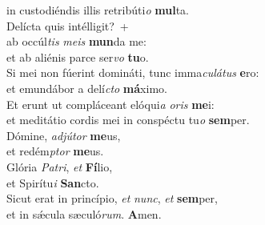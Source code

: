 \evenverse in custodiéndis illis retribúti\textit{o} \textbf{mul}ta.\\
\oddverse Delícta quis intélligit?~+\\
\oddverse  ab occúl\textit{tis} \textit{me}\textit{is} \textbf{mun}da me:~\*\\
\oddverse et ab aliénis parce ser\textit{vo} \textbf{tu}o.\\
\evenverse Si mei non fúerint domináti, tunc imma\textit{cu}\textit{lá}\textit{tus} \textbf{e}ro:~\*\\
\evenverse et emundábor a delí\textit{cto} \textbf{má}ximo.\\
\oddverse Et erunt ut compláceant elóqui\textit{a} \textit{o}\textit{ris} \textbf{me}i:~\*\\
\oddverse et meditátio cordis mei in conspéctu tu\textit{o} \textbf{sem}per.\\
\evenverse Dómine, \textit{ad}\textit{jú}\textit{tor} \textbf{me}us,~\*\\
\evenverse et redém\textit{ptor} \textbf{me}us.\\
\oddverse Glória \textit{Pa}\textit{tri}, \textit{et} \textbf{Fí}lio,~\*\\
\oddverse et Spirítu\textit{i} \textbf{San}cto.\\
\evenverse Sicut erat in princípio, \textit{et} \textit{nunc}, \textit{et} \textbf{sem}per,~\*\\
\evenverse et in sǽcula sæculó\textit{rum}. \textbf{A}men.\\
